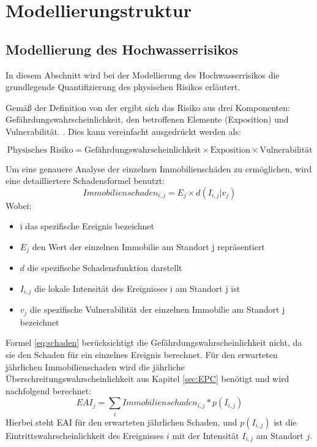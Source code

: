 
\section{Modellierungstruktur}
\subsection{Modellierung des Hochwasserrisikos}
In diesem Abschnitt wird bei der Modellierung des Hochwasserrisikos die grundlegende Quantifizierung des physischen Risikos erläutert.

Gemäß der Definition von der \textcite{undro1979,} ergibt sich das Risiko aus drei Komponenten: Gefährdungswahrscheinlichkeit,  den betroffenen Elemente (Exposition) und Vulnerabilität. \parencite{coburn1991vulnerability}. Dies kann vereinfacht ausgedrückt werden als:

\begin{equation}
    \text{Physisches Risiko} = \text{Gefährdungswahrscheinlichkeit} \times \text{Exposition} \times \text{Vulnerabilität}
\end{equation}

Um eine genauere Analyse der einzelnen Immobilienschäden zu ermöglichen, wird eine detailliertere Schadensformel \parencite{vanweddingen2023physicalrisk} benutzt:
\begin{equation}
    Immobilienschaden_{i,j} = E_j \times d(I_{i,j}|v_j)
    \label{eq:schaden}
\end{equation}
Wobei:
\begin{itemize}
    \item i das spezifische Ereignis bezeichnet
    \item $E_j$ den Wert der einzelnen Immobilie am Standort j repräsentiert
    \item $d$ die spezifische Schadensfunktion darstellt
    \item $I_{i,j}$ die lokale Intensität des Ereignisses i am Standort j ist
    \item $v_j$ die spezifische Vulnerabilität der einzelnen Immobilie am Standort j bezeichnet
\end{itemize}

Formel \ref{eq:schaden} berücksichtigt die Gefährdungswahrscheinlichkeit nicht, da sie den Schaden für ein einzelnes Ereignis berechnet. Für den erwarteten jährlichen Immobilienschaden wird die jährliche Überschreitungswahrscheinlichkeit aus Kapitel \ref{sec:EPC} benötigt und wird nachfolgend berechnet:
\begin{equation}
    EAI_j = \sum_i Immobilienschaden_{i,j} * p(I_{i,j})
\end{equation}
Hierbei steht \ac{EAI} für den erwarteten jährlichen Schaden, und \( p(I_{i,j}) \) ist die Eintrittswahrscheinlichkeit des Ereignisses \( i \) mit der Intensität \( I_{i,j} \) am Standort \( j \).
